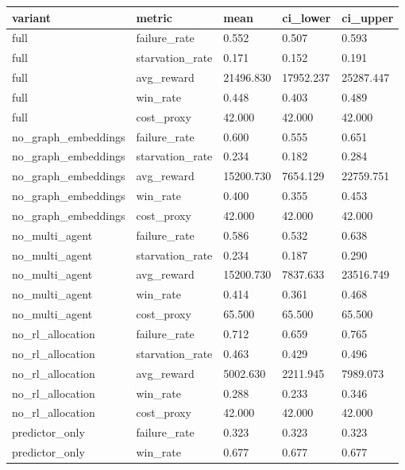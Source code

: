 \begin{tabular}{lllll}
\toprule
variant & metric & mean & ci\_lower & ci\_upper \\
\midrule
full & failure\_rate & 0.552 & 0.507 & 0.593 \\
full & starvation\_rate & 0.171 & 0.152 & 0.191 \\
full & avg\_reward & 21496.830 & 17952.237 & 25287.447 \\
full & win\_rate & 0.448 & 0.403 & 0.489 \\
full & cost\_proxy & 42.000 & 42.000 & 42.000 \\
no\_graph\_embeddings & failure\_rate & 0.600 & 0.555 & 0.651 \\
no\_graph\_embeddings & starvation\_rate & 0.234 & 0.182 & 0.284 \\
no\_graph\_embeddings & avg\_reward & 15200.730 & 7654.129 & 22759.751 \\
no\_graph\_embeddings & win\_rate & 0.400 & 0.355 & 0.453 \\
no\_graph\_embeddings & cost\_proxy & 42.000 & 42.000 & 42.000 \\
no\_multi\_agent & failure\_rate & 0.586 & 0.532 & 0.638 \\
no\_multi\_agent & starvation\_rate & 0.234 & 0.187 & 0.290 \\
no\_multi\_agent & avg\_reward & 15200.730 & 7837.633 & 23516.749 \\
no\_multi\_agent & win\_rate & 0.414 & 0.361 & 0.468 \\
no\_multi\_agent & cost\_proxy & 65.500 & 65.500 & 65.500 \\
no\_rl\_allocation & failure\_rate & 0.712 & 0.659 & 0.765 \\
no\_rl\_allocation & starvation\_rate & 0.463 & 0.429 & 0.496 \\
no\_rl\_allocation & avg\_reward & 5002.630 & 2211.945 & 7989.073 \\
no\_rl\_allocation & win\_rate & 0.288 & 0.233 & 0.346 \\
no\_rl\_allocation & cost\_proxy & 42.000 & 42.000 & 42.000 \\
predictor\_only & failure\_rate & 0.323 & 0.323 & 0.323 \\
predictor\_only & win\_rate & 0.677 & 0.677 & 0.677 \\
\bottomrule
\end{tabular}

